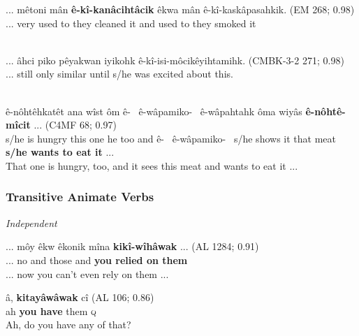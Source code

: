     \begin{exe}
    \ex 
    \gll ... mêtoni mân \textbf{ê-kî-kanâcihtâcik} êkwa mân ê-kî-kaskâpasahkik. (EM 268; 0.98) \\
         ... very {used to} {they cleaned it} and {used to} {they smoked it}  \\
    \trans  \\
    \label{vti-ive8}
    \end{exe}

    \begin{exe}
    \ex 
    \gll ... âhci piko pêyakwan iyikohk ê-kî-isi-môcikêyihtamihk. (CMBK-3-2 271; 0.98) \\
         ... still only similar until {s/he was excited about this}.  \\
    \trans  \\
    \label{vti-ive9}
    \end{exe}
    
    \begin{exe}
    \ex 
    \gll ê-nôhtêhkatêt ana wîst ôm ê-~ ê-wâpamiko-~ ê-wâpahtahk ôma wiyâs \textbf{ê-nôhtê-mîcit} ... (C4MF 68; 0.97) \\
         {s/he is hungry} {this one} {he too} and ê-~ ê-wâpamiko-~ {s/he shows it} that meat {\textbf{s/he wants to eat it}} ... \\
    \trans That one is hungry, too, and it sees this meat and wants to eat it ... \\
    \label{vti-ive10}
    \end{exe}





\subsubsection{Transitive Animate Verbs}

\textit{Independent}

    \begin{exe}
    \ex
    \gll ... môy êkw êkonik mîna \textbf{kikî-wîhâwak} ... \tiny{(AL 1284; 0.91)} \\
         ... no and those and {\textbf{you relied on them}}\\
    \trans  ... now you can't even rely on them ... \tiny{\citep[342-243]{Bearetal1992}}
    \label{ta-ive1}
    \end{exe}
    
    
    \begin{exe}
    \ex
    \gll â, \textbf{kitayâwâwak} cî \tiny{(AL 106; 0.86)} \\
        ah {\textbf{you have} them} \textsc{q}\\
    \trans  Ah, do you have any of that? \citep[250-251]{Bearetal1992}
    \label{ta-ive2}
    \end{exe}

